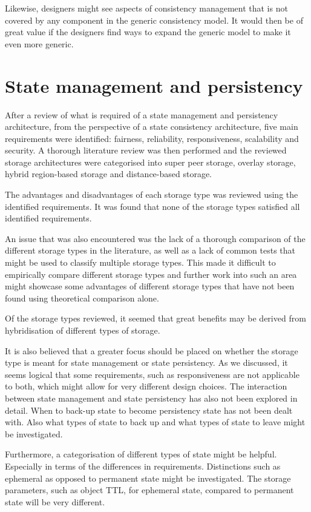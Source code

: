 Likewise, designers might see aspects of consistency management that is not covered by any component in the generic consistency model. It would then be of great value if the designers find ways to expand the generic model to make it even more generic.

\section{State management and persistency}

After a review of what is required of a state management and persistency architecture, from the perspective of a state consistency architecture, five main requirements were identified: fairness, reliability, responsiveness, scalability and security. A thorough literature review was then performed and the reviewed storage architectures were categorised into super peer storage, overlay storage, hybrid region-based storage and distance-based storage.

The advantages and disadvantages of each storage type was reviewed using the identified requirements. It was found that none of the storage types satisfied all identified requirements.

An issue that was also encountered was the lack of a thorough comparison of the different storage types in the literature, as well as a lack of common tests that might be used to classify multiple storage types. This made it difficult to empirically compare different storage types and further work into such an area might showcase some advantages of different storage types that have not been found using theoretical comparison alone.

Of the storage types reviewed, it seemed that great benefits may be derived from hybridisation of different types of storage.

It is also believed that a greater focus should be placed on whether the storage type is meant for state management or state persistency. As we discussed, it seems logical that some requirements, such as responsiveness are not applicable to both, which might allow for very different design choices. The interaction between state management and state persistency has also not been explored in detail. When to back-up state to become persistency state has not been dealt with. Also what types of state to back up and what types of state to leave might be investigated.

Furthermore, a categorisation of different types of state might be helpful. Especially in terms of the differences in requirements. Distinctions such as ephemeral as opposed to permanent state might be investigated. The storage parameters, such as object TTL, for ephemeral state, compared to permanent state will be very different.

